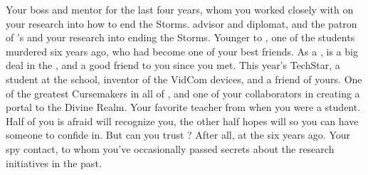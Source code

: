 \documentclass[char]{GL2020}
\begin{document}
\begin{contacts}
    \contact{\cHeadScientist{}} Your boss and mentor for the last four years, whom you worked closely with on your research into how to end the Storms. 
    \contact{\cDiplomat{}} \pTech{} advisor and diplomat, and the patron of \cHeadScientist{}'s and your research into ending the Storms.
    \contact{\cHeir{}} Younger \cHeir{\sibling} to \cHeirSibling{}, one of the students murdered six years ago, who had become one of your best friends. As a \cHeir{\formal}, \cHeir{} is a big deal in the \pTech{}, and a good friend to you since you met.
    \contact{\cTechStar{}} This year's TechStar, a student at the school, inventor of the VidCom devices, and a friend of yours. 
    \contact{\cCurse{}} One of the greatest Cursemakers in all of \pEarth{}, and one of your collaborators in creating a portal to the Divine Realm.
    \contact{\cMusic{}} Your favorite teacher from when you were a student. Half of you is afraid \cMusic{\they} will recognize you, the other half hopes \cMusic{\they} will so you can have someone to confide in. But can you trust \cMusic{\them}? After all, \cMusic{\theywere} at the \pSc{} six years ago.
    \contact{\cBunker{}} Your \pShippie{} spy contact, to whom you've occasionally passed secrets about the \pTech{} research initiatives in the past. 
\end{contacts}
\end{document}
